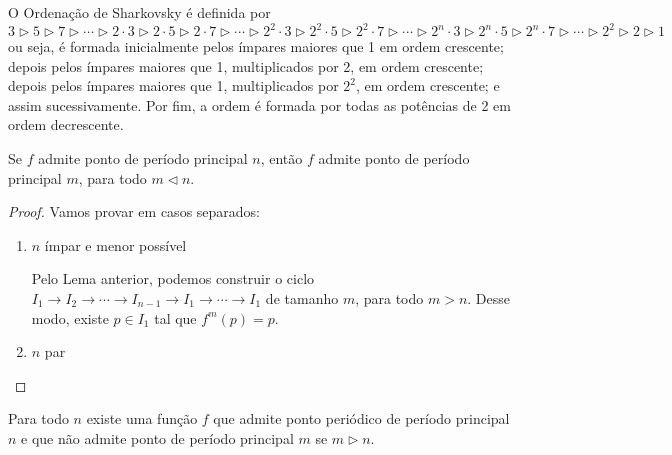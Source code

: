 \begin{definition}
O Ordenação de Sharkovsky é definida por
$$3 \triangleright 5 \triangleright 7 \triangleright \cdots
\triangleright 2 \cdot 3 \triangleright 2 \cdot 5 \triangleright 2 \cdot 7 \triangleright \cdots
\triangleright 2^2 \cdot 3 \triangleright 2^2 \cdot 5 \triangleright 2^2 \cdot 7 \triangleright \cdots
\triangleright 2^n \cdot 3 \triangleright 2^n \cdot 5 \triangleright 2^n \cdot 7 \triangleright \cdots
\triangleright 2^2 \triangleright 2 \triangleright 1$$
ou seja, é formada inicialmente pelos ímpares maiores que 1 em ordem crescente; depois pelos ímpares maiores que 1, multiplicados por 2, em ordem crescente; depois pelos ímpares maiores que 1, multiplicados por $2^2$, em ordem crescente; e assim sucessivamente. Por fim, a ordem é formada por todas as potências de 2 em ordem decrescente.
\end{definition}

\begin{theorem}
Se $f$ admite ponto de período principal $n$, então $f$ admite ponto de período principal $m$, para todo $m \triangleleft n$.
\end{theorem}

\begin{proof}
Vamos provar em casos separados:
\begin{enumerate}[label = (\alph*)]
\item $n$ ímpar e menor possível

Pelo Lema anterior,  podemos construir o ciclo $I_1 \longrightarrow I_2 \longrightarrow \cdots \longrightarrow I_{n-1} \longrightarrow I_1 \longrightarrow \cdots \longrightarrow I_1$ de tamanho $m$, para todo $m > n$. Desse modo, existe $p \in I_1$ tal que $f^m(p) = p$.

\item $n$ par
\end{enumerate}
\end{proof}

\begin{theorem}
Para todo $n$ existe uma função $f$ que admite ponto periódico de período principal $n$ e que não admite ponto de período principal $m$ se $m \triangleright n$.
\end{theorem}


